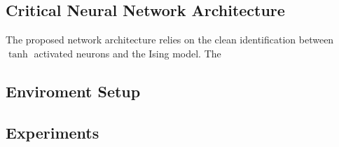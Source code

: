 \subsection{Critical Neural Network Architecture}

The proposed network architecture relies on the clean identification between $\tanh$ activated neurons and the Ising model. The

\subsection{Enviroment Setup}


\subsection{Experiments}